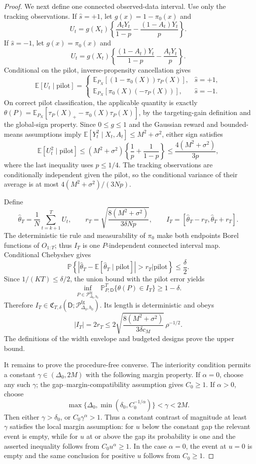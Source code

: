 \documentclass{article}
\begin{document}
\begin{proof}
We next define one connected observed-data interval.  Use only the tracking
observations.  If \(\widehat s=+1\), let \(g(x)=1-\pi_0(x)\) and
\[
 U_t=g(X_t)\left\{
 \frac{A_tY_t}{1-p}-\frac{(1-A_t)Y_t}{p}
 \right\}.
\]
If \(\widehat s=-1\), let \(g(x)=\pi_0(x)\) and
\[
 U_t=g(X_t)\left\{
 \frac{(1-A_t)Y_t}{1-p}-\frac{A_tY_t}{p}
 \right\}.
\]
Conditional on the pilot, inverse-propensity cancellation gives
\[
 \mathbb E[U_t\mid\text{pilot}]
 =\begin{cases}
 \mathbb E_{P_X}[(1-\pi_0(X))\tau_P(X)],&\widehat s=+1,\\
 \mathbb E_{P_X}[\pi_0(X)(-\tau_P(X))],&\widehat s=-1.
 \end{cases}
\]
On correct pilot classification, the applicable quantity is exactly
\(\theta(P)=\mathbb E_{P_X}[\tau_P(X)_+-\pi_0(X)\tau_P(X)]\), by the
targeting-gain definition and the global-sign property.  Since
\(0\leq g\leq1\) and the Gaussian reward and bounded-means assumptions imply
\(\mathbb E[Y_t^2\mid X_t,A_t]\leq M^2+\sigma^2\), either sign satisfies
\[
 \mathbb E[U_t^2\mid\text{pilot}]
 \leq(M^2+\sigma^2)\left\{\frac1p+\frac1{1-p}\right\}
 \leq\frac{4(M^2+\sigma^2)}{3p},
\]
where the last inequality uses \(p\leq1/4\).  The tracking observations are
conditionally independent given the pilot, so the conditional variance of
their average is at most \(4(M^2+\sigma^2)/(3Np)\).

Define
\[
 \widehat\theta_T=\frac1N\sum_{t=k+1}^T U_t,
 \qquad
 r_T=\sqrt{\frac{8(M^2+\sigma^2)}{3\delta Np}},
 \qquad
 I_T=[\widehat\theta_T-r_T,\widehat\theta_T+r_T].
\]
The deterministic tie rule and measurability of \(\pi_0\) make both endpoints
Borel functions of \(O_{1:T}\); thus \(I_T\) is one \(P\)-independent
connected interval map.  Conditional Chebyshev gives
\[
 \mathbb P\left\{
 |\widehat\theta_T-\mathbb E[\widehat\theta_T\mid\text{pilot}]|>r_T
 \mathrel{\big|}\text{pilot}
 \right\}\leq\frac\delta2.
\]
Since \(1/(KT)\leq\delta/2\), the union bound with the pilot error yields
\[
 \inf_{P\in\mathcal P_{\Delta_0,b_0}^{\mathrm{fg}}}
 \mathbb P_{P,\mathsf D}^{T}\{\theta(P)\in I_T\}
 \geq1-\delta.
\]
Therefore
\(I_T\in\mathfrak C_{T,\delta}(\mathsf D;
\mathcal P_{\Delta_0,b_0}^{\mathrm{fg}})\).  Its length is deterministic and
obeys
\[
 |I_T|=2r_T
 \leq
 2\sqrt{\frac{8(M^2+\sigma^2)}{3\delta c_M}}\,\rho^{-1/2}.
\]
The definitions of the width envelope and budgeted designs prove the upper
bound.

It remains to prove the procedure-free converse.  The interiority condition
permits a constant \(\gamma\in(\Delta_0,2M)\) with the following margin
property.  If \(\alpha=0\), choose any such \(\gamma\); the
gap--margin-compatibility assumption gives \(C_0\geq1\).  If \(\alpha>0\),
choose
\[
 \max\{\Delta_0,\min(\delta_0,C_0^{-1/\alpha})\}<\gamma<2M.
\]
Then either \(\gamma>\delta_0\), or
\(C_0\gamma^\alpha>1\).  Thus a constant contrast of magnitude at least
\(\gamma\) satisfies the local margin assumption: for \(u\) below the
constant gap the relevant event is empty, while for \(u\) at or above the gap
its probability is one and the asserted inequality follows from
\(C_0u^\alpha\geq1\).  In the case \(\alpha=0\), the event at \(u=0\) is
empty and the same conclusion for positive \(u\) follows from \(C_0\geq1\).


\end{proof}
\end{document}
